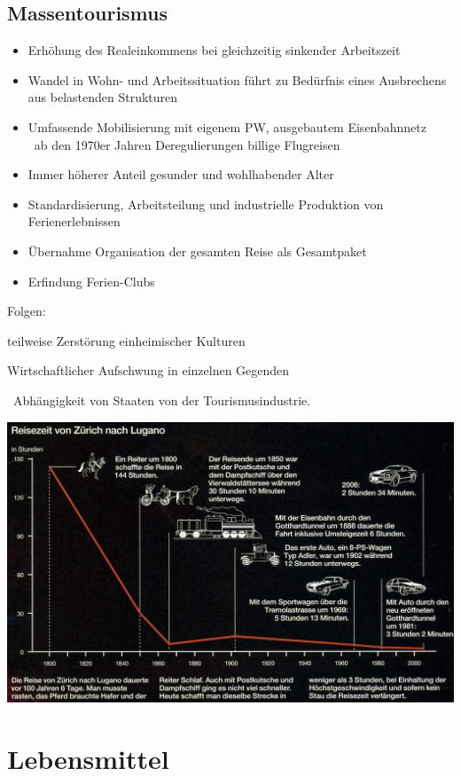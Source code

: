 \documentclass{report}
\begin{document}
\section{Massentourismus}
\begin{itemize}
	\item Erhöhung des Realeinkommens bei gleichzeitig sinkender Arbeitszeit
	\item Wandel in Wohn- und Arbeitssituation führt zu Bedürfnis eines Ausbrechens aus belastenden Strukturen
	\item Umfassende Mobilisierung mit eigenem PW, ausgebautem Eisenbahnnetz\\
	\arrow~ab den 1970er Jahren Deregulierungen billige Flugreisen
	\item Immer höherer Anteil gesunder und wohlhabender Alter
	\item Standardisierung, Arbeitsteilung und industrielle Produktion von Ferienerlebnissen
	\item Übernahme Organisation der gesamten Reise als Gesamtpaket
	\item Erfindung Ferien-Clubs
\end{itemize}
Folgen:\par
teilweise Zerstörung einheimischer Kulturen\par
Wirtschaftlicher Aufschwung in einzelnen Gegenden\par \arrow~Abhängigkeit von Staaten von der Tourismusindustrie.
\newpage

\includegraphics[width=\textwidth]{images/reiseweg.jpg}


\chapter{Lebensmittel}
\end{document}
